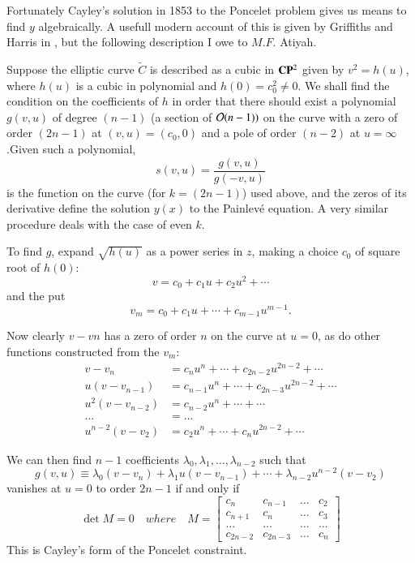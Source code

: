 Fortunately Cayley's solution in 1853 to the Poncelet problem gives us means to find $y$ algebraically. A usefull modern account of this is given by Griffiths and Harris in \cite{chap7-key5}, but the following description I owe to $M. F.$ Atiyah.

Suppose the elliptic curve $\tilde{C}$ is described as a cubic in $\mathbf{C}\mathbf{P}^{2}$ given by $v^{2}=h(u)$, where $h(u)$ is a cubic in polynomial and $h(0)= c_{0}^{2} \neq 0$. We shall find the condition on the coefficients of $h$ in order that there should exist a polynomial $g(v,u)$ of degree $(n-1)$ (a section of $\mathcal{O}(n-1))$ on the curve with a zero of order $(2n-1)$ at $(v,u)=(c_{0},0)$ and a pole of order $(n-2)$ at $u=\infty$.\pageoriginale Given such a polynomial,
$$
s(v,u)= \dfrac{g(v,u)}{g(-v,u)}
$$
is the function on the curve (for $k=(2n-1)$) used above, and the zeros of its derivative define the solution $y(x)$ to the Painlev\'e equation. A very similar procedure deals with the case of even $k$.

 To find $g$, expand $\sqrt{h(u)}$ as a power series in $z$, making a choice $c_{0}$ of square root of $h(0)$:
 $$
 v = c_{0}+c_{1}u+c_{2}u^{2}+ \cdots
 $$
 and the put
 $$
 v_{m}=c_{0}+c_{1}u+\cdots + c_{m-1}u^{m-1}.
 $$

 Now clearly $v-v{n}$ has a zero of order $n$ on the curve at $u=0$, as do other functions constructed from the $v_{m}$:
\begin{align*}
v-v_{n} &= c_{n}u^{n}+\cdots +c_{2n-2}u^{2n-2} + \cdots\\
u(v-v_{n-1}) &= c_{n-1}u^{n}+ \cdots + c_{2n-3}u^{2n-2}+ \cdots\\
u^{2}(v-v_{n-2}) &= c_{n-2}u^{n}+ \cdots + \cdots\\
\ldots \quad &= \ldots\\
u^{n-2}(v-v_{2}) &= c_{2}u^{n}+ \cdots + c_{n}u^{2n-2}+\cdots
\end{align*}

We can then find $n-1$ coefficients $\lambda_{0}, \lambda_{1},\ldots,\lambda_{n-2}$ such that 
$$
g(v,u) \equiv \lambda_{0}(v-v_{n}) + \lambda_{1}u(v-v_{n-1})+ \cdots+ \lambda_{n-2}u^{n-2}(v-v_{2})
$$
vanishes at $u=0$ to order $2n-1$ if and only if
\begin{equation*}\label{chap7-eq-17}
\det M=0 \quad where \quad M =
\begin{bmatrix}
c_{n} & c_{n-1} &\ldots &c_{2}\\
c_{n+1} & c_{n} &\ldots & c_{3}\\
\ldots & \ldots & \ldots & \ldots\\
c_{2n-2} & c_{2n-3} & \ldots & c_{n}
\end{bmatrix}\tag{17}
\end{equation*}
This is Cayley's form of the Poncelet constraint.

